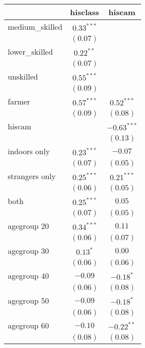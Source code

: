 
\begin{table}
\begin{center}
\begin{tabular}{l c c}
\hline
 & hisclass & hiscam \\
\hline
medium\_skilled & $0.33^{***}$  &               \\
                & $(0.07)$      &               \\
lower\_skilled  & $0.22^{**}$   &               \\
                & $(0.07)$      &               \\
unskilled       & $0.55^{***}$  &               \\
                & $(0.09)$      &               \\
farmer          & $0.57^{***}$  & $0.52^{***}$  \\
                & $(0.09)$      & $(0.08)$      \\
hiscam          &               & $-0.63^{***}$ \\
                &               & $(0.13)$      \\
indoors only    & $0.23^{***}$  & $-0.07$       \\
                & $(0.07)$      & $(0.05)$      \\
strangers only  & $0.25^{***}$  & $0.21^{***}$  \\
                & $(0.06)$      & $(0.05)$      \\
both            & $0.25^{***}$  & $0.05$        \\
                & $(0.07)$      & $(0.05)$      \\
agegroup 20     & $0.34^{***}$  & $0.11$        \\
                & $(0.06)$      & $(0.07)$      \\
agegroup 30     & $0.13^{*}$    & $0.00$        \\
                & $(0.06)$      & $(0.06)$      \\
agegroup 40     & $-0.09$       & $-0.18^{*}$   \\
                & $(0.06)$      & $(0.08)$      \\
agegroup 50     & $-0.09$       & $-0.18^{*}$   \\
                & $(0.06)$      & $(0.08)$      \\
agegroup 60     & $-0.10$       & $-0.22^{**}$  \\
                & $(0.08)$      & $(0.08)$      \\

\end{tabular}
\end{center}
\end{table}
